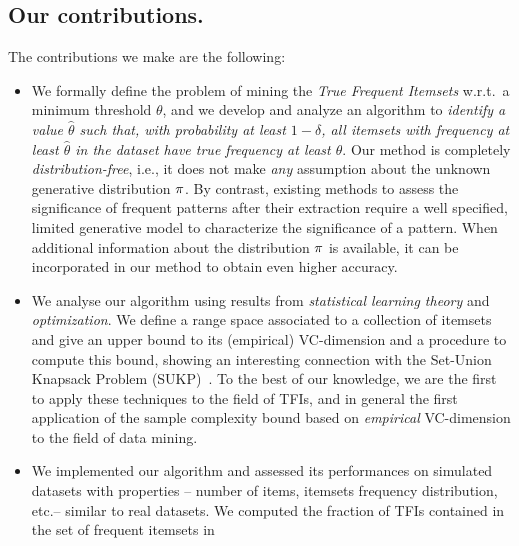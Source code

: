 \subsection{Our contributions.}
The contributions we make are the following:
\begin{itemize}
  \item We formally define the problem of mining the \emph{True Frequent
    Itemsets} w.r.t.~a minimum threshold $\theta$, and we develop and analyze an
    algorithm to \emph{identify a value $\hat{\theta}$ such that, with
    probability at least $1-\delta$, all itemsets
with frequency at least $\hat{\theta}$ in the dataset have true frequency
at least $\theta$}. Our method is completely \emph{distribution-free}, i.e., it
does not make \emph{any} assumption about the unknown generative distribution
$\pi$. %
By contrast, existing methods to assess the significance of frequent patterns after their
extraction %
require a well specified, limited generative model to characterize the
significance of a pattern. When %
additional information about the distribution $\pi$ is available, it can be
incorporated in our method to obtain even higher accuracy.
\item %
We analyse our algorithm using results from \emph{statistical learning theory} and \emph{optimization}. %
We define a range space associated to a collection of itemsets and give an upper
bound to its (empirical) VC-dimension and a procedure to compute this bound,
showing an interesting connection with the Set-Union
Knapsack Problem (SUKP)~\citep{GoldschmidtNY94}. 
To the best of our knowledge, we are the first to apply these
techniques to the field of TFIs, and in general the first application of the
sample complexity bound based on \emph{empirical} VC-dimension
to the field of data mining. 
\item We implemented our algorithm and assessed its performances on simulated
  datasets with properties -- number of items, itemsets frequency distribution,
  etc.-- similar to real datasets. We computed the fraction of TFIs contained in the set of frequent itemsets in

\end{itemize}
